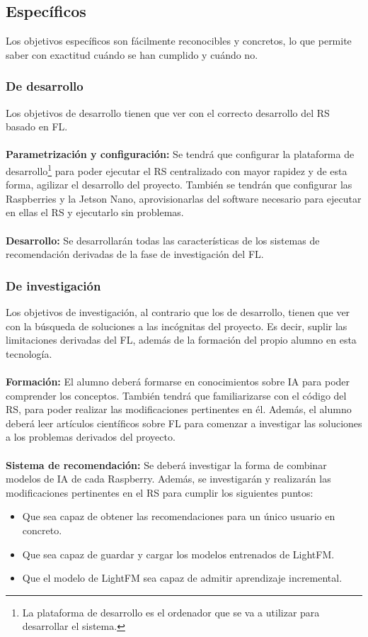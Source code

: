 \subsection{Específicos}
Los objetivos específicos son fácilmente reconocibles y concretos, lo que permite saber con exactitud cuándo se han cumplido y cuándo no.

\subsubsection{De desarrollo}
Los objetivos de desarrollo tienen que ver con el correcto desarrollo del RS basado en FL. 
\\ \\
\textbf{Parametrización y configuración: }
Se tendrá que configurar la plataforma de desarrollo\footnote{La plataforma de desarrollo es el ordenador que se va a utilizar para desarrollar el sistema.} para poder ejecutar el RS centralizado con mayor rapidez y de esta forma, agilizar el desarrollo del proyecto. También se tendrán que configurar las Raspberries y la Jetson Nano, aprovisionarlas del software necesario para ejecutar en ellas el RS y ejecutarlo sin problemas.
\\ \\
\textbf{Desarrollo: }
Se desarrollarán todas las características de los sistemas de recomendación derivadas de la fase de investigación del FL.

\subsubsection{De investigación}
Los objetivos de investigación, al contrario que los de desarrollo, tienen que ver con la búsqueda de soluciones a las incógnitas del proyecto. Es decir, suplir las limitaciones derivadas del FL, además de la formación del propio alumno en esta tecnología.
\\ \\
\textbf{Formación: }
El alumno deberá formarse en conocimientos sobre IA para poder comprender los conceptos. También tendrá que familiarizarse con el código del RS, para poder realizar las modificaciones pertinentes en él. Además, el alumno deberá leer artículos científicos sobre FL para comenzar a investigar las soluciones a los problemas derivados del proyecto.
\\ \\
\textbf{Sistema de recomendación: }
Se deberá investigar la forma de combinar modelos de IA de cada Raspberry. Además, se investigarán y realizarán las modificaciones pertinentes en el RS para cumplir los siguientes puntos:
\begin{itemize}
    \item Que sea capaz de obtener las recomendaciones para un único usuario en concreto. 
    \item Que sea capaz de guardar y cargar los modelos entrenados de LightFM.
    \item Que el modelo de LightFM sea capaz de admitir aprendizaje incremental.
\end{itemize}

